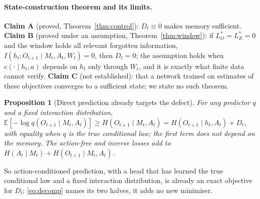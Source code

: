 \documentclass[11pt]{article}
\theoremstyle{plain}
\newtheorem{proposition}[theorem]{Proposition}
\theoremstyle{definition}
\theoremstyle{remark}
\newcommand{\E}{\mathbb{E}}
\begin{document}
\paragraph{State-construction theorem and its limits.}
\textbf{Claim A} (proved, Theorem~\ref{thm:control}): $D_t \equiv 0$ makes memory sufficient. \textbf{Claim B} (proved under an assumption, Theorem~\ref{thm:window}): if $L^*_O = L^*_E = 0$ and the window holds all relevant forgotten information, $I(h_t; O_{t+1} \mid M_t, A_t, W_t) = 0$, then $D_t = 0$; the assumption holds when $e(\cdot \mid h_t, a)$ depends on $h_t$ only through $W_t$, and it is exactly what finite data cannot verify. \textbf{Claim C} (not established): that a network trained on estimates of these objectives converges to a sufficient state; we state no such theorem.
\begin{proposition}[Direct prediction already targets the defect]\label{prop:direct}
For any predictor $q$ and a fixed interaction distribution, $\E[-\log q(O_{t+1} \mid M_t, A_t)] \ge H(O_{t+1} \mid M_t, A_t) = H(O_{t+1} \mid h_t, A_t) + D_t$, with equality when $q$ is the true conditional law; the first term does not depend on the memory. The action-free and inverse losses add to $H(A_t \mid M_t) + H(O_{t+1} \mid M_t, A_t)$.
\end{proposition}
So action-conditioned prediction, with a head that has learned the true conditional law and a fixed interaction distribution, is already an exact objective for $D_t$; \eqref{eq:decomp} names its two halves, it adds no new minimiser.
\end{document}

